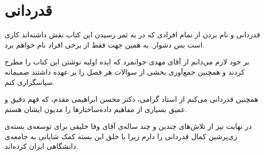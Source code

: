 \section*{قدردانی}
قدردانی و نام بردن از تمام افرادی که در به ثمر رسیدن این کتاب نقش داشته‌اند کاری است بس دشوار. به همین جهت فقط از برخی افراد نام خواهم برد.

بر خود لازم می‌دانم از آقای مهدی جوانمرد که ایده‌ اولیه نوشتن این کتاب را مطرح کردند و همچنین جمع‌آوری بخشی از سوالات هر فصل را بر عهده داشتند صمیمانه سپاسگزاری کنم.

همچنین قدردانی می‌کنم از استاد گرامی، دکتر محسن ابراهیمی مقدم، که فهم دقیق و عمیق بسیاری از مفاهیم داده‌ساختارها را مدیون ایشان هستم.

در نهایت نیز از تلاش‌‌های چندین و چند ساله‌ی آقای وفا خلیقی برای توسعه‌ی بسته‌ی زی‌پرشین کمال قدردانی را دارم زیرا با خلق این بسته کمک شایانی به جامعه‌ی دانشگاهی ایران کرده‌اند.